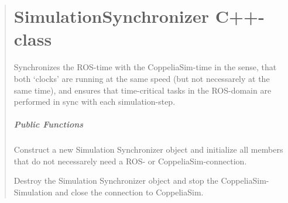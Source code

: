 \documentclass[letterpaper,10pt,english]{sphinxmanual}
\begin{document}
\begin{quote}
\chapter{SimulationSynchronizer C++-class}
\label{\detokenize{SimulationSynchronizer:simulationsynchronizer-c-class}}\label{\detokenize{SimulationSynchronizer:simulation-synchronizer}}\label{\detokenize{SimulationSynchronizer::doc}}

\begin{fulllineitems}
\label{\detokenize{SimulationSynchronizer:_CPPv2N21coppeliasim_interface22SimulationSynchronizerE}}%
\pysigstartmultiline
{}\label{\detokenize{SimulationSynchronizer:project0classcoppeliasim__interface_1_1SimulationSynchronizer}}%
\pysigstopmultiline
Synchronizes the ROS-time with the CoppeliaSim-time in the sense, that both ‘clocks’ are running at the same speed (but not necessarely at the same time), and ensures that time-critical tasks in the ROS-domain are performed in sync with each simulation-step. 
\paragraph{Public Functions}

\begin{fulllineitems}
\label{\detokenize{SimulationSynchronizer:_CPPv2N21coppeliasim_interface22SimulationSynchronizer22SimulationSynchronizerEv}}%
\pysigstartmultiline
{}\label{\detokenize{SimulationSynchronizer:project0classcoppeliasim__interface_1_1SimulationSynchronizer_1ac18bb936436db0207cb883539542667b}}%
\pysigstopmultiline
Construct a new Simulation Synchronizer object and initialize all members that do not necessarely need a ROS- or CoppeliaSim-connection. 

\end{fulllineitems}


\begin{fulllineitems}
\label{\detokenize{SimulationSynchronizer:_CPPv2N21coppeliasim_interface22SimulationSynchronizerD0Ev}}%
\pysigstartmultiline
{}\label{\detokenize{SimulationSynchronizer:project0classcoppeliasim__interface_1_1SimulationSynchronizer_1afc14256edba11b6ef38de06292476f10}}%
\pysigstopmultiline
Destroy the Simulation Synchronizer object and stop the CoppeliaSim-Simulation and close the connection to CoppeliaSim. 


\end{fulllineitems}
\end{fulllineitems}
\end{quote}
\end{document}
